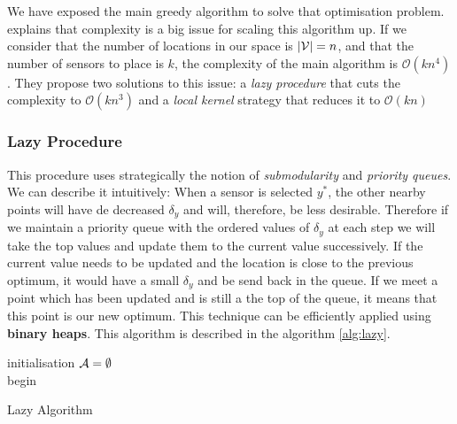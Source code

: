 
We have exposed the main greedy algorithm to solve that optimisation problem. \citet{krause_near-optimal_2008} explains that complexity is a big issue for scaling this algorithm up. If we consider that the number of locations in our space is $|\mathcal{V}| = n$, and that the number of sensors to place is $k$, the complexity of the main algorithm is $\mathcal{O}(kn^4)$. They propose two solutions to this issue: a \textit{lazy procedure} that cuts the complexity to  $\mathcal{O}(kn^3)$ and a \textit{local kernel} strategy that reduces it to $\mathcal{O}(kn)$

\subsubsection{Lazy Procedure} This procedure uses strategically the notion of \textit{submodularity} and \textit{priority queues}. We can describe it intuitively: When a sensor is selected $y^*$, the other nearby points will have de decreased $\delta_y$ and will, therefore, be less desirable. Therefore if we maintain a priority queue with the ordered values of $\delta_y$ at each step we will take the top values and update them to the current value successively. If the current value needs to be updated and the location is close to the previous optimum, it would have a small $\delta_y$ and be send back in the queue. If we meet a point which has been updated and is still a the top of the queue, it means that this point is our new optimum. This technique can be efficiently applied using \textbf{binary heaps}. This algorithm is described in the algorithm \ref{alg:lazy}. \\ 


\begin{algorithm}[h]
 initialisation\;
 $\mathcal{A} = \emptyset$ \\
 begin\;
\caption{Lazy Algorithm}
\label{alg:lazy}
\end{algorithm}

